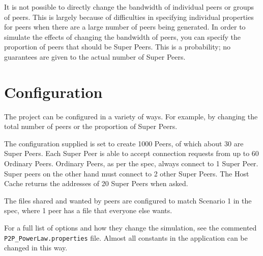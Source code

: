 It is not possible to directly change the bandwidth of individual peers or
groups of peers. This is largely because of difficulties in specifying
individual properties for peers when there are a large number of peers being
generated.  In order to simulate the effects of changing the bandwidth of
peers, you can specify the proportion of peers that should be Super Peers.
This is a probability; no guarantees are given to the actual number of Super
Peers.

\section{Configuration}

The project can be configured in a variety of ways. For example, by changing
the total number of peers or the proportion of Super Peers.

The configuration supplied is set to create 1000 Peers, of which about 30 are
Super Peers. Each Super Peer is able to accept connection requests from up to
60 Ordinary Peers. Ordinary Peers, as per the spec, always connect to 1 Super
Peer.  Super peers on the other hand must connect to 2 other Super Peers. The
Host Cache returns the addresses of 20 Super Peers when asked.

The files shared and wanted by peers are configured to match Scenario 1 in the
spec, where 1 peer has a file that everyone else wants.

For a full list of options and how they change the simulation, see the
commented \verb!P2P_PowerLaw.properties! file. Almost all constants in the
application can be changed in this way.

